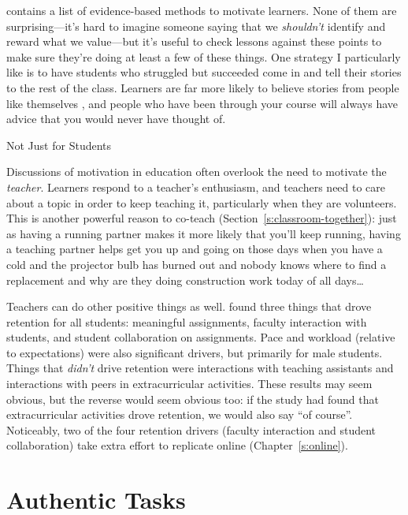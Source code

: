 \cite{Ambr2010} contains a list of evidence-based methods to motivate
learners. None of them are surprising---it's hard to imagine someone
saying that we \emph{shouldn't} identify and reward what we value---but it's
useful to check lessons against these points to make sure they're doing
at least a few of these things. One strategy I particularly like is to
have students who struggled but succeeded come in and tell their stories
to the rest of the class. Learners are far more likely to believe
stories from people like themselves \cite{Mill2016a}, and people who
have been through your course will always have advice that you would
never have thought of.

\begin{aside}{Not Just for Students}

Discussions of motivation in education often overlook the need to
motivate the \emph{teacher}. Learners respond to a teacher's enthusiasm,
and teachers need to care about a topic in order to keep teaching it,
particularly when they are volunteers. This is another powerful reason
to co-teach (Section~\ref{s:classroom-together}): just as having a
running partner makes it more likely that you'll keep running, having
a teaching partner helps get you up and going on those days when you
have a cold and the projector bulb has burned out and nobody knows
where to find a replacement and why are they doing construction work
today of all days{\ldots}

\end{aside}

Teachers can do other positive things as well. \cite{Bark2014} found
three things that drove retention for all students: meaningful
assignments, faculty interaction with students, and student
collaboration on assignments. Pace and workload (relative to
expectations) were also significant drivers, but primarily for male
students. Things that \emph{didn't} drive retention were interactions with
teaching assistants and interactions with peers in extracurricular
activities. These results may seem obvious, but the reverse would seem
obvious too: if the study had found that extracurricular activities
drove retention, we would also say ``of course''. Noticeably, two of the
four retention drivers (faculty interaction and student collaboration)
take extra effort to replicate online (Chapter~\ref{s:online}).

\section{Authentic Tasks}\label{s:motivation-authentic}

